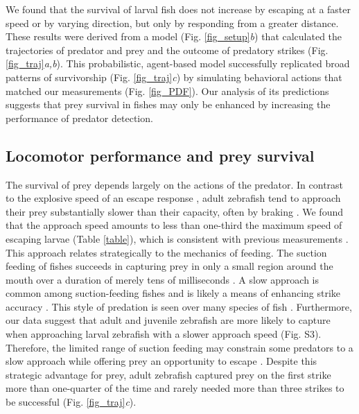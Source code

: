 \documentclass[]{rsos}%
\begin{document}
We found that the survival of larval fish does not increase by escaping at a faster speed or by varying direction, but only by responding from a greater distance.
These results were derived from a model (Fig. \ref{fig_setup}\textit{b}) that calculated the trajectories of predator and prey and the outcome of predatory strikes (Fig. \ref{fig_traj}\textit{a,b}). 
This probabilistic, agent-based model successfully replicated broad patterns of survivorship (Fig. \ref{fig_traj}\textit{c}) by simulating behavioral actions that matched our measurements (Fig. \ref{fig_PDF}).
Our analysis of its predictions suggests that prey survival in fishes may only be enhanced by increasing the performance of predator detection.

\subsection{Locomotor performance and prey survival} 

The survival of prey depends largely on the actions of the predator.
In contrast to the explosive speed of an escape response \cite{Muller:2004hp}, adult zebrafish tend to approach their prey substantially slower than their capacity, often by braking \cite{McHenry:2005tc}.
We found that the approach speed amounts to less than one-third the maximum speed of escaping larvae (Table \ref{table}), which is consistent with previous measurements \cite{Stewart:2013bha}.
This approach relates strategically to the mechanics of feeding.
The suction feeding of fishes succeeds in capturing prey in only a small region around the mouth over a duration of merely tens of milliseconds \cite{FerryGraham:2003bz,Higham:2005kg,Holzman:2007p15907}.
A slow approach is common among suction-feeding fishes and is likely a means of enhancing strike accuracy \cite{Webb:1984jz,Higham:2007go}.
This style of predation is seen over many species of fish \cite{Higham:2007hy}.
Furthermore, our data suggest that adult and juvenile zebrafish are more likely to capture when approaching larval zebrafish with a slower approach speed (Fig. S3).
Therefore, the limited range of suction feeding may constrain some predators to a slow approach while offering prey an opportunity to escape \cite{Holzman:2009uu}.
Despite this strategic advantage for prey, adult zebrafish captured prey on the first strike more than one-quarter of the time and rarely needed more than three strikes to be successful (Fig. \ref{fig_traj}\textit{c}).
\end{document}
